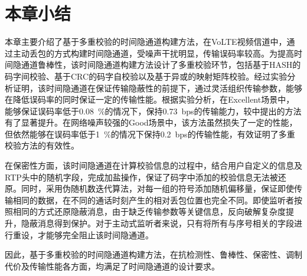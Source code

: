 \section{本章小结}
\label{chap:hash:summary}

本章主要介绍了基于多重校验的时间隐通道构建方法，在VoLTE视频信道中，通过主动丢包的方式构建时间隐通道，受噪声干扰明显，传输误码率较高。为提高时间隐通道鲁棒性，该时间隐通道构建方法设计了多重校验环节，包括基于HASH的码字间校验、基于CRC的码字自校验以及基于异或的映射矩阵校验。经过实验分析证明，该时间隐通道在保证传输隐蔽性的前提下，通过灵活组织传输参数，能够在降低误码率的同时保证一定的传输性能。根据实验分析，在Excellent场景中，能够保证误码率低于0.08\ \%的情况下，保持0.73\ bps的传输能力，较中提出的方法有了显著提升。在网络噪声较强的Good场景中，该方法虽然损失了一定的性能，但依然能够在误码率低于1\ \%的情况下保持0.2\ bps的传输性能，有效证明了多重校验方法的有效性。

在保密性方面，该时间隐通道在计算校验信息的过程中，结合用户自定义的信息及RTP头中的随机字段，完成加盐操作，保证了码字中添加的校验信息无法被还原。同时，采用伪随机数迭代算法，对每一组的符号添加随机偏移量，保证即使传输相同的数据，在不同的通话时刻产生的相对丢包位置也完全不同。即使监听者按照相同的方式还原隐蔽消息，由于缺乏传输参数等关键信息，反向破解复杂度提升，隐蔽消息得到保护。对于主动式监听者来说，只有将所有与序号相关的字段进行重设，才能够完全阻止该时间隐通道。

因此，基于多重校验的时间隐通道构建方法，在抗检测性、鲁棒性、保密性、调制代价及传输性能各方面，均满足了时间隐通道的设计要求。